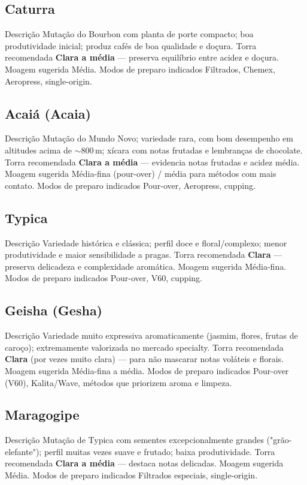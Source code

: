 \documentclass[a4paper,12pt]{article}
\begin{document}
\subsection{Caturra}
{Descrição} Mutação do Bourbon com planta de porte compacto; boa produtividade inicial; produz cafés de boa qualidade e doçura.  
{Torra recomendada} \textbf{Clara a média} — preserva equilíbrio entre acidez e doçura.  
{Moagem sugerida} Média.  
{Modos de preparo indicados} Filtrados, Chemex, Aeropress, single-origin.

\subsection{Acaiá (Acaia)}
{Descrição} Mutação do Mundo Novo; variedade rara, com bom desempenho em altitudes acima de \(\sim\)800\,m; xícara com notas frutadas e lembranças de chocolate.  
{Torra recomendada} \textbf{Clara a média} — evidencia notas frutadas e acidez média.  
{Moagem sugerida} Média-fina (pour-over) / média para métodos com mais contato.  
{Modos de preparo indicados} Pour-over, Aeropress, cupping.

\subsection{Typica}
{Descrição} Variedade histórica e clássica; perfil doce e floral/complexo; menor produtividade e maior sensibilidade a pragas.  
{Torra recomendada} \textbf{Clara} — preserva delicadeza e complexidade aromática.  
{Moagem sugerida} Média-fina.  
{Modos de preparo indicados} Pour-over, V60, cupping.

\subsection{Geisha (Gesha)}
{Descrição} Variedade muito expressiva aromaticamente (jasmim, flores, frutas de caroço); extremamente valorizada no mercado specialty.  
{Torra recomendada} \textbf{Clara} (por vezes muito clara) — para não mascarar notas voláteis e florais.  
{Moagem sugerida} Média-fina a média.  
{Modos de preparo indicados} Pour-over (V60), Kalita/Wave, métodos que priorizem aroma e limpeza.

\subsection{Maragogipe}
{Descrição} Mutação de Typica com sementes excepcionalmente grandes ("grão-elefante"); perfil muitas vezes suave e frutado; baixa produtividade.  
{Torra recomendada} \textbf{Clara a média} — destaca notas delicadas.  
{Moagem sugerida} Média.  
{Modos de preparo indicados} Filtrados especiais, single-origin.
\end{document}

